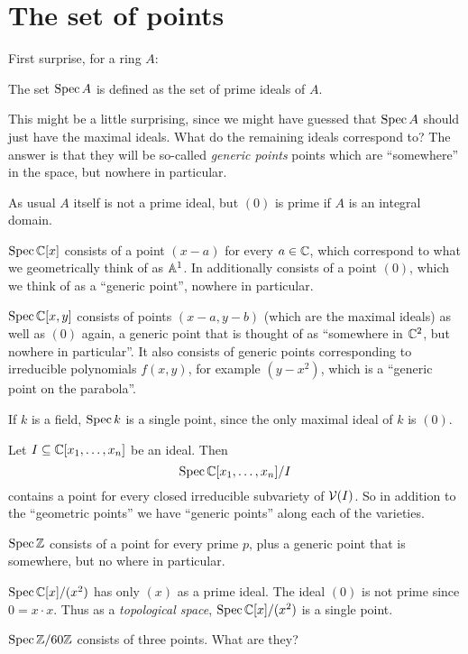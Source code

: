 \section{The set of points}

First surprise, for a ring $A$:
\begin{definition}
	The set $\operatorname{Spec} A$ is defined as the set of prime ideals of $A$.
\end{definition}

This might be a little surprising, since we might have guessed
that $\operatorname{Spec} A$ should just have the maximal ideals.
What do the remaining ideals correspond to?
The answer is that they will be so-called \emph{generic points}
points which are ``somewhere'' in the space, but nowhere in particular.

\begin{remark}
	As usual $A$ itself is not a prime ideal, but $(0)$
	is prime if $A$ is an integral domain.
\end{remark}

\begin{example}
	\listhack
	\begin{enumerate}[(a)]
		\ii $\operatorname{Spec} \mathbb C[x]$ consists of a point $(x-a)$ for every $a \in \mathbb C$,
		which correspond to what we geometrically think of as $\mathbb A^1$.
		In additionally consists of a point $(0)$,
		which we think of as a ``generic point'', nowhere in particular.

		\ii $\operatorname{Spec} \mathbb C[x,y]$ consists of points $(x-a,y-b)$
		(which are the maximal ideals) as well as $(0)$ again, a generic
		point that is thought of as ``somewhere in $\mathbb C^2$,
		but nowhere in particular''.
		It also consists of generic points corresponding to irreducible
		polynomials $f(x,y)$, for example $(y-x^2)$,
		which is a ``generic point on the parabola''.

		\ii If $k$ is a field, $\operatorname{Spec} k$ is a single point,
		since the only maximal ideal of $k$ is $(0)$.
	\end{enumerate}
\end{example}
\begin{example}
	Let $I \subseteq \mathbb C[x_1, \dots, x_n]$ be an ideal.
	Then \[ \operatorname{Spec} \mathbb C[x_1, \dots, x_n] /I \] contains a
	point for every closed irreducible subvariety of $\mathcal V(I)$.
	So in addition to the ``geometric points'' we have
	``generic points'' along each of the varieties.
\end{example}
\begin{example}
	\listhack
	\begin{enumerate}[(a)]
		\ii $\operatorname{Spec} \mathbb Z$ consists of a point for every prime $p$,
		plus a generic point that is somewhere, but no where in particular.

		\ii $\operatorname{Spec} \mathbb C[x] / (x^2)$ has only $(x)$ as a prime ideal.
		The ideal $(0)$ is not prime since $0 = x \cdot x$.
		Thus as a \emph{topological space},
		$\operatorname{Spec} \mathbb C[x] / (x^2)$ is a single point.
		
		\ii $\operatorname{Spec} \mathbb Z/60\mathbb Z$ consists of three points.
		What are they?
	\end{enumerate}
\end{example}

